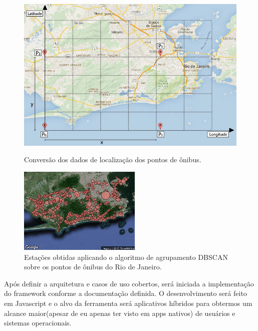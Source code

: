 \documentclass[12pt]{report} %
\begin{document}
\begin{figure}[!ht]
	\centering
	\begin{minipage}[t]{0.49\textwidth}
		\includegraphics[width=\textwidth]{conversao.png}
		\caption
		{
			Conversão dos dados de localização dos pontos de ônibus.
		}
		\label{fig:conversao}
	\end{minipage}
	\hfill
	\begin{minipage}[t]{0.47\textwidth}
		\includegraphics[width=\textwidth]{stations-v3.png}
		\caption
		{
			Estações obtidas aplicando o algoritmo de agrupamento DBSCAN sobre os pontos de ônibus do Rio de Janeiro.
		}
		\label{fig:stacoes}
	\end{minipage}	
\end{figure}

Após definir a arquitetura e casos de uso cobertos, será iniciada a implementação do framework conforme a documentação definida. O desenvolvimento será feito em Javascript e o alvo da ferramenta será aplicativos híbridos para obtermos um alcance maior(apesar de eu apenas ter visto em apps nativos) de usuários e sistemas operacionais.  
\end{document}
